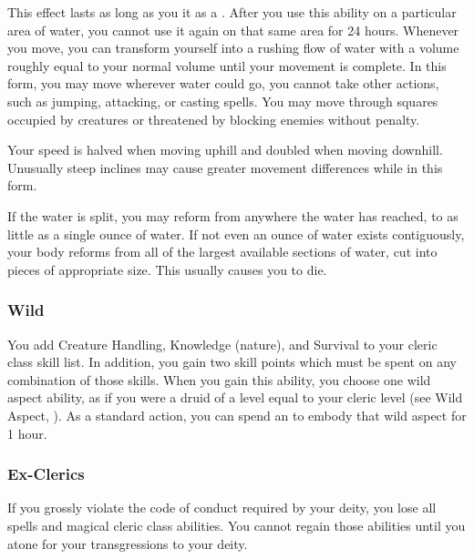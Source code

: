             This effect lasts as long as you  it as a .
            After you use this ability on a particular area of water, you cannot use it again on that same area for 24 hours.
            Whenever you move, you can transform yourself into a rushing flow of water with a volume roughly equal to your normal volume until your movement is complete.
            In this form, you may move wherever water could go, you cannot take other actions, such as jumping, attacking, or casting spells.
            You may move through squares occupied by creatures or threatened by blocking enemies without penalty.
            \par Your speed is halved when moving uphill and doubled when moving downhill.
            Unusually steep inclines may cause greater movement differences while in this form.
            \par If the water is split, you may reform from anywhere the water has reached, to as little as a single ounce of water.
            If not even an ounce of water exists contiguously, your body reforms from all of the largest available sections of water, cut into pieces of appropriate size.
            This usually causes you to die.

        \subsubsection{Wild}
             You add Creature Handling, Knowledge (nature), and Survival to your cleric class skill list.
            In addition, you gain two skill points which must be spent on any combination of those skills.
             When you gain this ability, you choose one wild aspect ability, as if you were a druid of a level equal to your cleric level (see Wild Aspect, ).
            As a standard action, you can spend an  to embody that wild aspect for 1 hour.

        \subsubsection{Ex-Clerics}
            If you grossly violate the code of conduct required by your deity, you lose all spells and magical cleric class abilities.
            You cannot regain those abilities until you atone for your transgressions to your deity.

